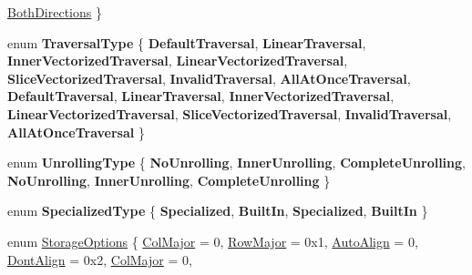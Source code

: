 \begin{DoxyCompactItemize}
\hyperlink{group__enums_ggad49a7b3738e273eb00932271b36127f7aa01e40fce022901560ce6d9fdee2fde3}{Both\+Directions}
 \}
\item 
\mbox{\label{namespace_eigen_a3d2409f30bc18e288e66de7ac53f71e5}} 
enum {\bfseries Traversal\+Type} \{ \newline
{\bfseries Default\+Traversal}, 
{\bfseries Linear\+Traversal}, 
{\bfseries Inner\+Vectorized\+Traversal}, 
{\bfseries Linear\+Vectorized\+Traversal}, 
\newline
{\bfseries Slice\+Vectorized\+Traversal}, 
{\bfseries Invalid\+Traversal}, 
{\bfseries All\+At\+Once\+Traversal}, 
{\bfseries Default\+Traversal}, 
\newline
{\bfseries Linear\+Traversal}, 
{\bfseries Inner\+Vectorized\+Traversal}, 
{\bfseries Linear\+Vectorized\+Traversal}, 
{\bfseries Slice\+Vectorized\+Traversal}, 
\newline
{\bfseries Invalid\+Traversal}, 
{\bfseries All\+At\+Once\+Traversal}
 \}
\item 
\mbox{\label{namespace_eigen_ab8c7299b77156ae8c7827ba61787669d}} 
enum {\bfseries Unrolling\+Type} \{ \newline
{\bfseries No\+Unrolling}, 
{\bfseries Inner\+Unrolling}, 
{\bfseries Complete\+Unrolling}, 
{\bfseries No\+Unrolling}, 
\newline
{\bfseries Inner\+Unrolling}, 
{\bfseries Complete\+Unrolling}
 \}
\item 
\mbox{\label{namespace_eigen_a8f4ff3ed63ee9637dda3fedea4bba1ea}} 
enum {\bfseries Specialized\+Type} \{ {\bfseries Specialized}, 
{\bfseries Built\+In}, 
{\bfseries Specialized}, 
{\bfseries Built\+In}
 \}
\item 
enum \hyperlink{group__enums_gaacded1a18ae58b0f554751f6cdf9eb13}{Storage\+Options} \{ \newline
\hyperlink{group__enums_ggaacded1a18ae58b0f554751f6cdf9eb13a0cbd4bdd0abcfc0224c5fcb5e4f6669a}{Col\+Major} = 0, 
\hyperlink{group__enums_ggaacded1a18ae58b0f554751f6cdf9eb13acfcde9cd8677c5f7caf6bd603666aae3}{Row\+Major} = 0x1, 
\hyperlink{group__enums_ggaacded1a18ae58b0f554751f6cdf9eb13a28d63c0dd8560827162decfd898804f4}{Auto\+Align} = 0, 
\hyperlink{group__enums_ggaacded1a18ae58b0f554751f6cdf9eb13a40a452614141522dd313363dbbd65726}{Dont\+Align} = 0x2, 
\newline
\hyperlink{group__enums_ggaacded1a18ae58b0f554751f6cdf9eb13a0cbd4bdd0abcfc0224c5fcb5e4f6669a}{Col\+Major} = 0, 

\end{DoxyCompactItemize}
